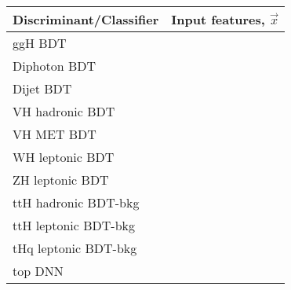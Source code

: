 \begin{tabular}{l|m{11cm}<{\centering}}
    Discriminant/Classifier & Input features, $\vec{x}$ \\ \hline
    ggH BDT &  \\ \hline
    
    Diphoton BDT &  \\ \hline
    
    Dijet BDT &  \\ \hline
    
    VH hadronic BDT &  \\ \hline    
    
    VH MET BDT &  \\ \hline
    
    WH leptonic BDT &  \\ \hline
    
    ZH leptonic BDT &  \\ \hline

    ttH hadronic BDT-bkg &  \\ \hline
    
    ttH leptonic BDT-bkg &  \\ \hline
    
    tHq leptonic BDT-bkg &  \\ \hline
    
    top DNN &  \\
\end{tabular}
